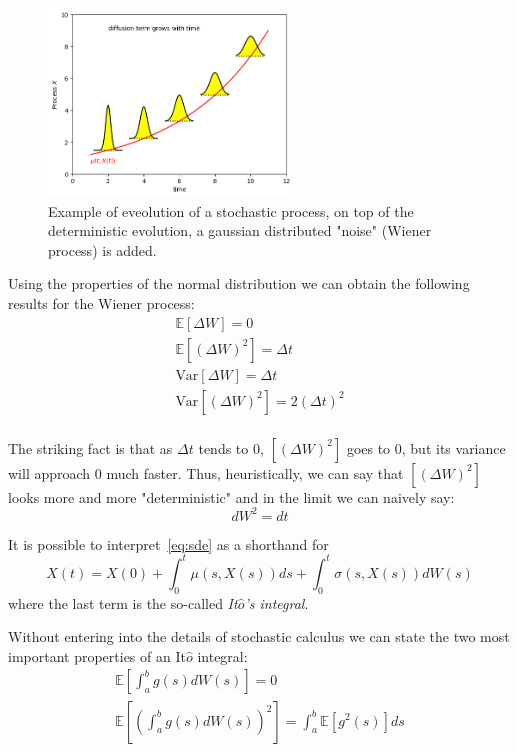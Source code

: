 \documentclass[12pt,a4paper]{book}
\begin{document}
\begin{figure}[htpb]
\begin{center}
	\includegraphics[height=5cm]{brownian_process}
\end{center}
\caption{Example of eveolution of a stochastic process, on top of the deterministic evolution, a gaussian distributed "noise" (Wiener process) is added.}
\end{figure}

Using the properties of the normal distribution we can obtain the following results for the Wiener process:
\begin{equation*}
\begin{gathered}
\mathbb{E}[\Delta W] = 0 \\
\mathbb{E}[(\Delta W)^2] = \Delta t \\
\text{Var}[\Delta W] = \Delta t \\
\text{Var}[(\Delta W)^2] = 2(\Delta t)^2 \\
\end{gathered}
\end{equation*}

The striking fact is that as $\Delta t$ tends to 0, $[(\Delta W)^2]$ goes to 0, but its variance will approach 0 much faster.
Thus, heuristically, we can say that $[(\Delta W)^2]$ looks more and more "deterministic" and in the limit we can naively say:
\begin{equation*}
\boxed{dW^2 = dt}
\end{equation*}

It is possible to interpret~\ref{eq:sde} as a shorthand for 
\begin{equation*}
X(t) = X(0) + \int_0^t \mu(s,X(s)) ds + \int_0^t \sigma(s,X(s)) dW(s)
\end{equation*}
where the last term is the so-called \emph{It$\hat{o}$'s integral}.

Without entering into the details of stochastic calculus we can state the two most important properties of an It$\hat{o}$ integral:
\begin{equation*}
\begin{gathered}
\mathbb{E}\left[\int_a^b g(s) dW(s)\right] = 0 \\
\mathbb{E}\left[\left(\int_a^b g(s) dW(s)\right)^2\right] = \int_a^b\mathbb{E}[g^2(s)]ds\\
\end{gathered}
\end{equation*}
\end{document}
